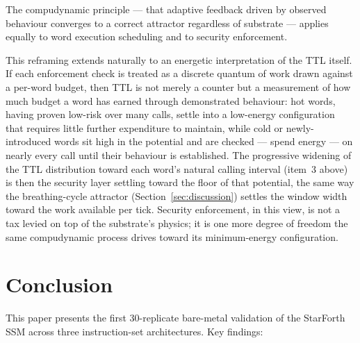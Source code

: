 \documentclass[10pt,a4paper]{article}
\begin{document}
The compudynamic principle --- that adaptive feedback driven by observed
behaviour converges to a correct attractor regardless of substrate ---
applies equally to word execution scheduling and to security enforcement.

This reframing extends naturally to an energetic interpretation of the TTL
itself. If each enforcement check is treated as a discrete quantum of work
drawn against a per-word budget, then TTL is not merely a counter but a
measurement of how much budget a word has earned through demonstrated
behaviour: hot words, having proven low-risk over many calls, settle into a
low-energy configuration that requires little further expenditure to
maintain, while cold or newly-introduced words sit high in the potential and
are checked --- spend energy --- on nearly every call until their behaviour
is established. The progressive widening of the TTL distribution toward each
word's natural calling interval (item~3 above) is then the security layer
settling toward the floor of that potential, the same way the breathing-cycle
attractor (Section~\ref{sec:discussion}) settles the window width toward the
work available per tick. Security enforcement, in this view, is not a tax
levied on top of the substrate's physics; it is one more degree of freedom
the same compudynamic process drives toward its minimum-energy
configuration.

\section{Conclusion}
\label{sec:conclusion}

This paper presents the first 30-replicate bare-metal validation of the
StarForth SSM across three instruction-set architectures.  Key findings:
\end{document}
